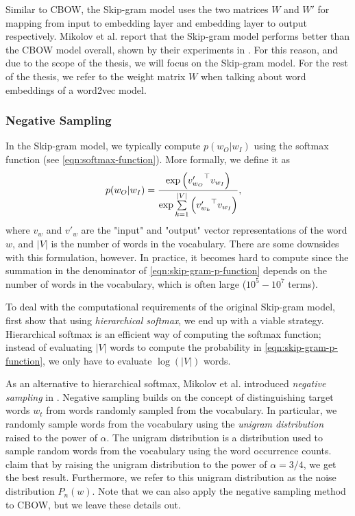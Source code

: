 Similar to CBOW, the Skip-gram model uses the two matrices $W$ and $W'$ for mapping from input to embedding layer and embedding layer to output respectively. Mikolov et al. report that the Skip-gram model performs better than the CBOW model overall, shown by their experiments in \cite{mikolov2013a}. For this reason, and due to the scope of the thesis, we will focus on the Skip-gram model. For the rest of the thesis, we refer to the weight matrix $W$ when talking about word embeddings of a word2vec model.

\subsubsection{Negative Sampling}
In the Skip-gram model, we typically compute $p(w_O | w_I)$ using the softmax function (see \cref{eqn:softmax-function}). More formally, we define it as
\begin{align}
    p(w_O | w_I)
    &= \frac{\exp{ \left( {v'_{w_O}}^\top v_{w_I} \right) }} {\exp{ \sum\limits_{k=1}^{|V|} \left( {v'_{w_k}}^\top v_{w_I} \right) }},
    \label{eqn:skip-gram-p-function}
\end{align}
where $v_w$ and $v'_w$ are the "input" and "output" vector representations of the word $w$, and $|V|$ is the number of words in the vocabulary. There are some downsides with this formulation, however. In practice, it becomes hard to compute since the summation in the denominator of \cref{eqn:skip-gram-p-function} depends on the number of words in the vocabulary, which is often large ($10^5 - 10^7$ terms).

To deal with the computational requirements of the original Skip-gram model, \cite{mikolov2013b} first show that using \textit{hierarchical softmax}, we end up with a viable strategy. Hierarchical softmax is an efficient way of computing the softmax function; instead of evaluating $|V|$ words to compute the probability in \cref{eqn:skip-gram-p-function}, we only have to evaluate $\log \left( |V| \right)$ words.

As an alternative to hierarchical softmax, Mikolov et al. introduced \textit{negative sampling} in \cite{mikolov2013b}. Negative sampling builds on the concept of distinguishing target words $w_t$ from words randomly sampled from the vocabulary. In particular, we randomly sample words from the vocabulary using the \textit{unigram distribution} raised to the power of $\alpha$. The unigram distribution is a distribution used to sample random words from the vocabulary using the word occurrence counts. \cite{mikolov2013b} claim that by raising the unigram distribution to the power of $\alpha = 3/4$, we get the best result. Furthermore, we refer to this unigram distribution as the noise distribution $P_n(w)$. Note that we can also apply the negative sampling method to CBOW, but we leave these details out.


